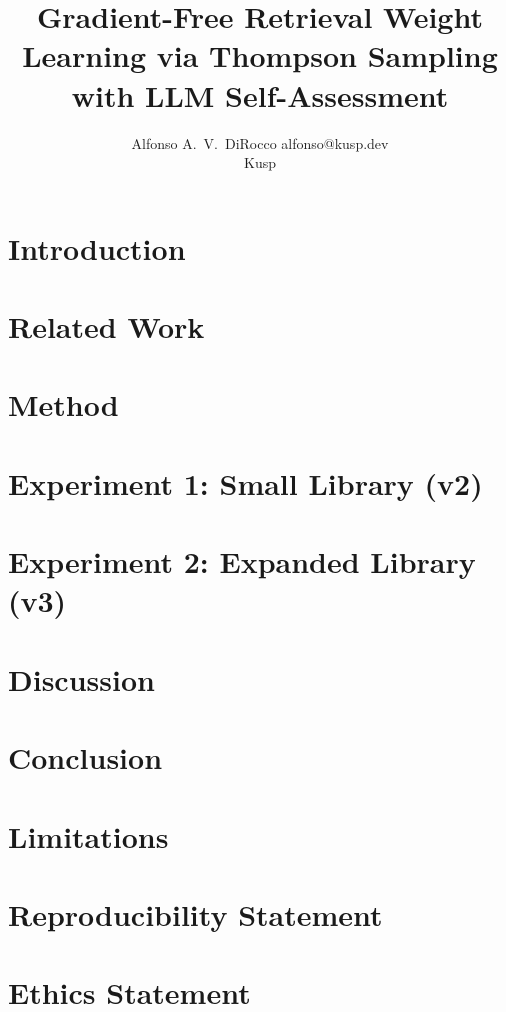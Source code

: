 \documentclass[10pt]{article}
\title{Gradient-Free Retrieval Weight Learning via Thompson Sampling with LLM Self-Assessment}
\author{\name Alfonso A.~V.~DiRocco \email alfonso@kusp.dev \\
  \addr Kusp}
\begin{document}
\maketitle

\begin{abstract}

\end{abstract}

\section{Introduction}
\label{sec:introduction}


\section{Related Work}
\label{sec:related_work}


\section{Method}
\label{sec:method}


\section{Experiment 1: Small Library (v2)}
\label{sec:experiment_v2}


\section{Experiment 2: Expanded Library (v3)}
\label{sec:experiment_v3}


\section{Discussion}
\label{sec:discussion}


\section{Conclusion}
\label{sec:conclusion}


\section*{Limitations}


\section*{Reproducibility Statement}


\section*{Ethics Statement}





\appendix

\end{document}
